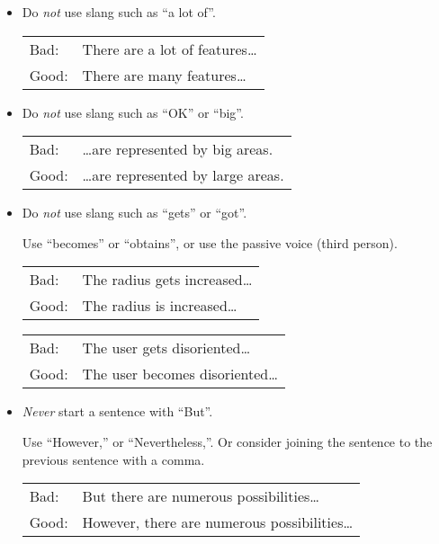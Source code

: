 \begin{itemize}
\item Do \emph{not} use slang such as ``a lot of''.

\begin{tabular}{lp{0.9\hsize}}
Bad:  & There are a lot of features\ldots       \\
Good: & There are many features\ldots       \\
\end{tabular}



\item Do \emph{not} use slang such as ``OK'' or ``big''.

\begin{tabular}{lp{0.9\hsize}}
Bad:  & \ldots are represented by big areas.    \\
Good: & \ldots are represented by large areas.  \\
\end{tabular}



\item Do \emph{not} use slang such as ``gets'' or ``got''.

Use ``becomes'' or ``obtains'', or use the passive voice (third
person).

\begin{tabular}{lp{0.9\hsize}}
Bad:  & The radius gets increased\ldots       \\
Good: & The radius is increased\ldots         \\
\end{tabular}

\begin{tabular}{lp{0.9\hsize}}
Bad:  & The user gets disoriented\ldots       \\
Good: & The user becomes disoriented\ldots    \\
\end{tabular}




\item \emph{Never} start a sentence with ``But''.

Use ``However,'' or ``Nevertheless,''. Or consider joining the
sentence to the previous sentence with a comma.

\begin{tabular}{lp{0.9\hsize}}
Bad:  & But there are numerous possibilities\ldots       \\
Good: & However, there are numerous possibilities\ldots  \\
\end{tabular}




\end{itemize}
